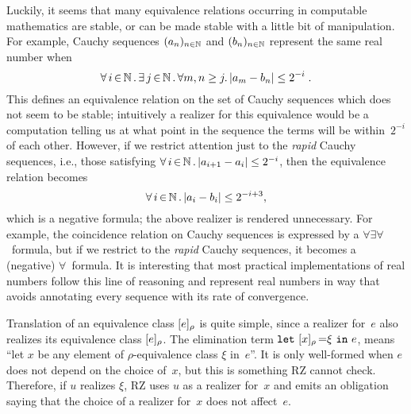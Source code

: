 Luckily, it seems that many equivalence relations occurring in
computable mathematics are stable, or can be made stable with a little
bit of manipulation.
%
\iflong
For example, Cauchy sequences $(a_n)_{n\in\mathbb{N}}$
and $(b_n)_{n\in\mathbb{N}}$ represent the same real number when
%
\begin{equation}
  \label{eq:cauchy}%
  \xall{i}{\NN}{
    \xsome{j}{\NN}{
      \forall m,n \geq j.\,|a_m - b_n| \leq 2^{-i}
    }
  } \;.
\end{equation}
%
This defines an equivalence relation on the set of Cauchy sequences
which does not seem to be stable; intuitively a realizer for this
equivalence would be a computation telling us at what point
in the sequence the terms will be within~$2^{-i}$ of each other.
%
However, if we restrict attention just to the \emph{rapid} Cauchy
sequences, i.e., those satisfying $\forall\, i \,{\in}\, \mathbb{N}\,.\,|a_{i+1} - a_i| \leq
  2^{-i}$, then the equivalence relation becomes
%
\begin{equation*}
  \forall\, i \,{\in}\, \mathbb{N}\,.\,|a_i - b_i| \leq 2^{-i+3},
\end{equation*}
%
which is a negative formula; the above realizer is rendered
unnecessary.
%
\else %
%
For example, the coincidence relation on Cauchy sequences is expressed
by a $\forall\exists\forall$~formula, but if we restrict to the
\emph{rapid} Cauchy sequences, it becomes a (negative)
$\forall$~formula.
%
\fi %
It is interesting that most practical implementations of
real numbers follow this line of reasoning and represent real numbers in
way that avoids annotating every sequence with its rate of convergence.

Translation of an equivalence class $[e]_{\rho}$ is quite
simple, since a realizer for~$e$ also realizes its equivalence class
$[e]_{\rho}$. The elimination term
$\texttt{let}\ [x]_{\rho}\,{=}\xi\ \texttt{in}\ e$, means ``let $x$ be any element of
$\rho$-equivalence class $\xi$ in~$e$''. It is only well-formed when
$e$ does not depend on the choice of~$x$, but this is something RZ
cannot check. Therefore, if $u$ realizes $\xi$, RZ uses $u$ as a
realizer for~$x$ and emits an obligation saying that the choice of a
realizer for~$x$ does not affect~$e$.

